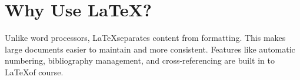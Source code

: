 \section{Why Use \LaTeX?}
Unlike word processors, \LaTeX separates content from formatting. This makes large documents easier to maintain and more consistent. Features like automatic numbering, bibliography management, and cross-referencing are built in to \LaTeX of course.

